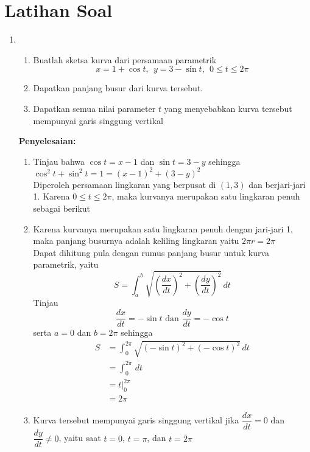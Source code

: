 \documentclass{article}
\begin{document}
\section{Latihan Soal}
\begin{enumerate}
	\item \begin{enumerate}
		\item Buatlah sketsa kurva dari persamaan parametrik 
		$$ x=1+\cos t, ~~ y=3-\sin t, ~~ 0\leq t\leq 2\pi $$
		\item Dapatkan panjang busur dari kurva tersebut.
		\item Dapatkan semua nilai parameter $t$ yang menyebabkan kurva tersebut mempunyai garis singgung vertikal 
	\end{enumerate}
	\textbf{Penyelesaian:}
	\begin{enumerate}
		\item Tinjau bahwa $\cos t=x-1$ dan $\sin t=3-y$ sehingga $\cos^2 t+\sin^2 t =1=(x-1)^2+(3-y)^2$ \\Diperoleh persamaan lingkaran yang berpusat di $(1,3)$ dan berjari-jari 1. Karena $0\leq t\leq 2\pi$, maka kurvanya merupakan satu lingkaran penuh sebagai berikut
		\begin{center}
	\end{center}
	\item Karena kurvanya merupakan satu lingkaran penuh dengan jari-jari 1, maka panjang busurnya adalah keliling lingkaran yaitu $2\pi r=2\pi$\\
	Dapat dihitung pula dengan rumus panjang busur untuk kurva parametrik, yaitu 
	$$ S=\int_a^b \sqrt{\left(\dfrac{dx}{dt}\right)^2+\left(\dfrac{dy}{dt}\right)^2}\, dt $$ 
	Tinjau 
	$$ \dfrac{dx}{dt} = -\sin t \text{   dan   } \dfrac{dy}{dt}=-\cos t $$
	serta $a=0$ dan $b=2\pi$ sehingga 
	\begin{align*}
	S &= \int_0^{2\pi}\sqrt{(-\sin t)^2+(-\cos t)^2}\, dt\\
	&= \int_0^{2\pi}\, dt\\
	&= t\big|_0^{2\pi}\\
	&= 2\pi 
	\end{align*}
	\item Kurva tersebut mempunyai garis singgung vertikal jika $\dfrac{dx}{dt}=0$ dan $\dfrac{dy}{dt}\neq 0$, yaitu saat $t=0$, $t=\pi$, dan $t=2\pi$

\end{enumerate}
\end{enumerate}
\end{document}
